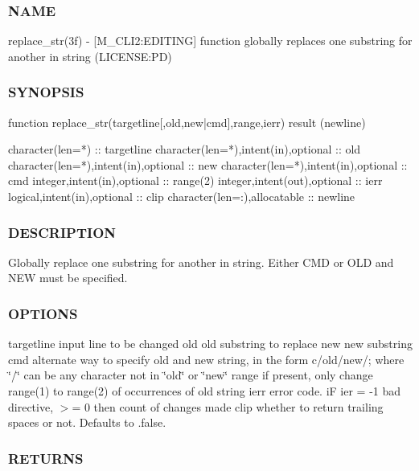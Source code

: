 \subsubsection*{N\+A\+ME}

replace\+\_\+str(3f) -\/ \mbox{[}M\+\_\+\+C\+L\+I2\+:E\+D\+I\+T\+I\+NG\mbox{]} function globally replaces one substring for another in string (L\+I\+C\+E\+N\+SE\+:PD) 

\subsubsection*{S\+Y\+N\+O\+P\+S\+IS}

\begin{DoxyVerb}function replace_str(targetline[,old,new|cmd],range,ierr) result (newline)

 character(len=*)                       :: targetline
 character(len=*),intent(in),optional   :: old
 character(len=*),intent(in),optional   :: new
 character(len=*),intent(in),optional   :: cmd
 integer,intent(in),optional            :: range(2)
 integer,intent(out),optional           :: ierr
 logical,intent(in),optional            :: clip
 character(len=:),allocatable           :: newline
\end{DoxyVerb}
 \subsubsection*{D\+E\+S\+C\+R\+I\+P\+T\+I\+ON}

Globally replace one substring for another in string. Either C\+MD or O\+LD and N\+EW must be specified.

\subsubsection*{O\+P\+T\+I\+O\+NS}

targetline input line to be changed old old substring to replace new new substring cmd alternate way to specify old and new string, in the form c/old/new/; where \char`\"{}/\char`\"{} can be any character not in \char`\"{}old\char`\"{} or \char`\"{}new\char`\"{} range if present, only change range(1) to range(2) of occurrences of old string ierr error code. iF ier = -\/1 bad directive, $>$= 0 then count of changes made clip whether to return trailing spaces or not. Defaults to .false. \subsubsection*{R\+E\+T\+U\+R\+NS}

